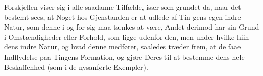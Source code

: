 \documentclass[12pt]{book}
\def\textit#1{#1}%
\def\emph#1{#1}%
\newcommand{\opage}[1]{\marginnote{\footnotesize\textit{[#1]}}}
\begin{document}
Forskjellen viser sig i alle saadanne Tilfælde, især som grundet da, naar det bestemt
sees, at \emph{Noget} hos Gjenstanden er at udlede af Tin%
\opage{125}\emph{gens egen indre Natur}, som denne i og for sig maa tænkes at være, \emph{Andet}
derimod har sin Grund i Omstændigheder eller Forhold, som ligge udenfor den, men under
hvilke hiin dens indre Natur, og hvad denne medfører, saaledes træder frem, at de faae
Indflydelse paa Tingens Formation, og gjøre Deres til at bestemme dens hele Beskaffenhed
(som i de nysanførte Exempler).
\end{document}
